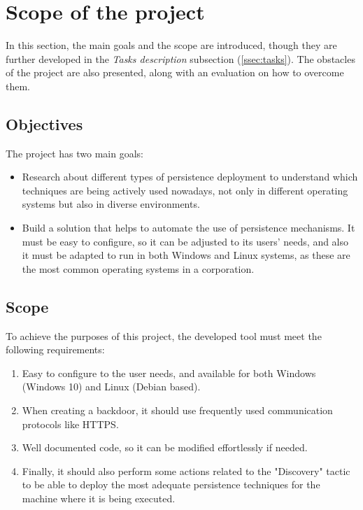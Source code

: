 \section{Scope of the project}
In this section, the main goals and the scope are introduced, though they are further developed in the \textit{Tasks description} subsection (\ref{ssec:tasks}). The obstacles of the project are also presented, along with an evaluation on how to overcome them.

\subsection{Objectives}
\label{ssec:objectives}
The project has two main goals:
\begin{itemize}
\item Research about different types of persistence deployment to understand which techniques are being actively used nowadays, not only in different operating systems but also in diverse environments.
\item Build a solution that helps to automate the use of persistence mechanisms. It must be easy to configure, so it can be adjusted to its users' needs, and also it must be adapted to run in both Windows and Linux systems, as these are the most common operating systems in a corporation.
\end{itemize}

\subsection{Scope}
\label{ssec:scope}
To achieve the purposes of this project, the developed tool must meet the following requirements:
\begin{enumerate}
\item Easy to configure to the user needs, and available for both Windows (Windows 10) and Linux (Debian based).
\item When creating a backdoor, it should use frequently used communication protocols like HTTPS.
\item Well documented code, so it can be modified effortlessly if needed.
\item Finally, it should also perform some actions related to the "Discovery" tactic to be able to deploy the most adequate persistence techniques for the machine where it is being executed.
\end{enumerate}

